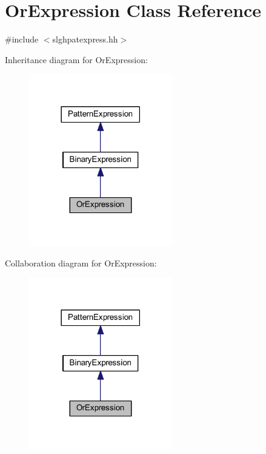 \hypertarget{class_or_expression}{}\section{Or\+Expression Class Reference}
\label{class_or_expression}


{\ttfamily \#include $<$slghpatexpress.\+hh$>$}



Inheritance diagram for Or\+Expression\+:
\nopagebreak
\begin{figure}[H]
\begin{center}
\leavevmode
\includegraphics[width=177pt]{class_or_expression__inherit__graph}
\end{center}
\end{figure}


Collaboration diagram for Or\+Expression\+:
\nopagebreak
\begin{figure}[H]
\begin{center}
\leavevmode
\includegraphics[width=177pt]{class_or_expression__coll__graph}
\end{center}
\end{figure}
